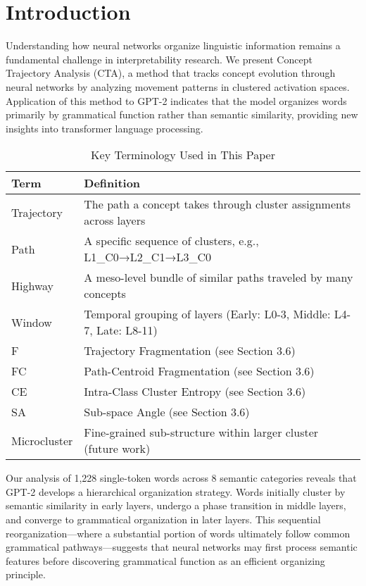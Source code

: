 \section{Introduction}

Understanding how neural networks organize linguistic information remains a fundamental challenge in interpretability research. We present Concept Trajectory Analysis (CTA), a method that tracks concept evolution through neural networks by analyzing movement patterns in clustered activation spaces. Application of this method to GPT-2 indicates that the model organizes words primarily by grammatical function rather than semantic similarity, providing new insights into transformer language processing.

\begin{table}[h!]
\centering
\caption{Key Terminology Used in This Paper}
\label{tab:glossary}
\begin{tabular}{ll}
\toprule
\textbf{Term} & \textbf{Definition} \\
\midrule
Trajectory & The path a concept takes through cluster assignments across layers \\
Path & A specific sequence of clusters, e.g., L1\_C0→L2\_C1→L3\_C0 \\
Highway & A meso-level bundle of similar paths traveled by many concepts \\
Window & Temporal grouping of layers (Early: L0-3, Middle: L4-7, Late: L8-11) \\
F & Trajectory Fragmentation (see Section 3.6) \\
FC & Path-Centroid Fragmentation (see Section 3.6) \\
CE & Intra-Class Cluster Entropy (see Section 3.6) \\
SA & Sub-space Angle (see Section 3.6) \\
Microcluster & Fine-grained sub-structure within larger cluster (future work) \\
\bottomrule
\end{tabular}
\end{table}

Our analysis of 1,228 single-token words across 8 semantic categories reveals that GPT-2 develops a hierarchical organization strategy. Words initially cluster by semantic similarity in early layers, undergo a phase transition in middle layers, and converge to grammatical organization in later layers. This sequential reorganization—where a substantial portion of words ultimately follow common grammatical pathways—suggests that neural networks may first process semantic features before discovering grammatical function as an efficient organizing principle.

